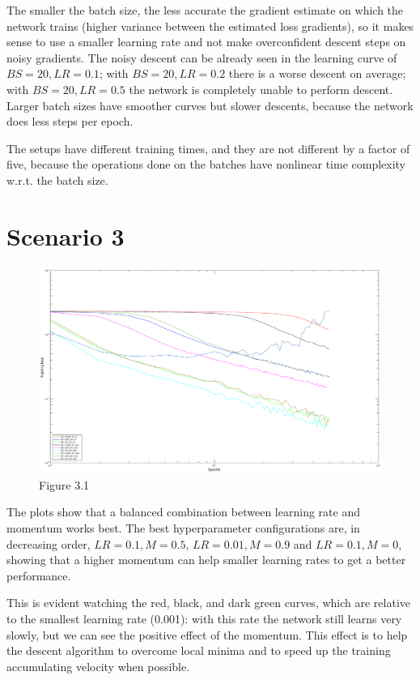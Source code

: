 \documentclass{article}
\begin{document}
    The smaller the batch size, the less accurate the gradient estimate on which the network trains (higher variance between the estimated loss gradients), so it makes sense to use a smaller learning rate
    and not make overconfident descent steps on noisy gradients. The noisy descent can be already seen in the learning curve of $BS = 20, LR = 0.1$; with $BS = 20, LR = 0.2$ there is a worse descent on average; 
    with $BS = 20, LR = 0.5$ the network is completely unable to perform descent. Larger batch sizes have smoother curves but slower descents, because the network does less steps per epoch.
    
    The setups have different training times, and they are not different by a factor of five, because the operations done on the batches have nonlinear time complexity w.r.t. the batch size.
    
    
    
\section*{Scenario 3}
	\begin{figure}[!htb]
        \centering
        \includegraphics[width=\textwidth]{figures/sc3_tr_loss}
        \captionsetup{labelformat=empty}
        \caption{Figure 3.1}
    \end{figure}
    
    The plots show that a balanced combination between learning rate and momentum works best. The best hyperparameter configurations are, in decreasing order, 
    $LR = 0.1, M = 0.5$, $LR = 0.01, M = 0.9$ and $LR = 0.1, M = 0$, showing that a higher momentum can help smaller learning rates to get a better performance. 
    
    This is evident watching the red, black, and dark green curves, which are relative to the smallest learning rate (0.001): with this rate the network still learns very slowly, but we can see the positive effect of the momentum. 
    This effect is to help the descent algorithm to overcome local minima and to speed up the training accumulating velocity when possible.
    
\end{document}
